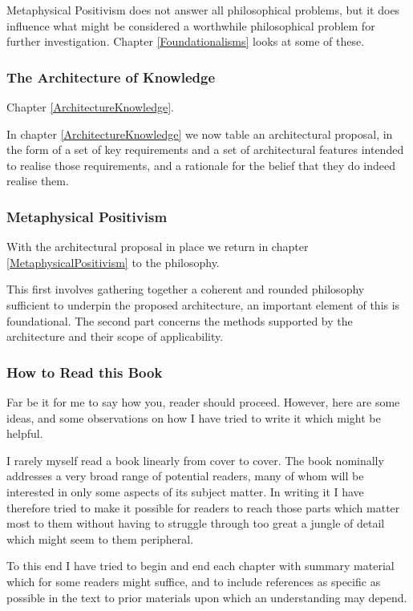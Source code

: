 Metaphysical Positivism does not answer all philosophical problems,
but it does influence what might be considered a worthwhile
philosophical problem for further investigation.
Chapter \ref{Foundationalisms} looks at some of these.

\subsubsection{The Architecture of Knowledge}

Chapter \ref{ArchitectureKnowledge}.

In chapter \ref{ArchitectureKnowledge} we now table an architectural
  proposal, in the form of a set of key requirements and a set of
  architectural features intended to realise those requirements, and a
  rationale for the belief that they do indeed realise them.

\subsubsection{Metaphysical Positivism}

With the architectural proposal in place we return in chapter
\ref{MetaphysicalPositivism} to the philosophy.

This first involves gathering together a coherent and rounded
philosophy sufficient to underpin the proposed architecture, an
important element of this is foundational.
The second part concerns the methods supported by the architecture and their scope of applicability.

\subsubsection{How to Read this Book}

Far be it for me to say how you, reader should proceed.
However, here are some ideas, and some observations on how I have
tried to write it which might be helpful.

I rarely myself read a book linearly from cover to cover.
The book nominally addresses a very broad range of potential readers,
many of whom will be interested in only some aspects of its subject
matter.
In writing it I have therefore tried to make it possible for readers
to reach those parts which matter most to them without having to
struggle through too great a jungle of detail which might seem to them
peripheral.

To this end I have tried to begin and end each chapter with summary
material which for some readers might suffice, and to include 
references as specific as possible in the text to prior materials upon
which an understanding may depend.


